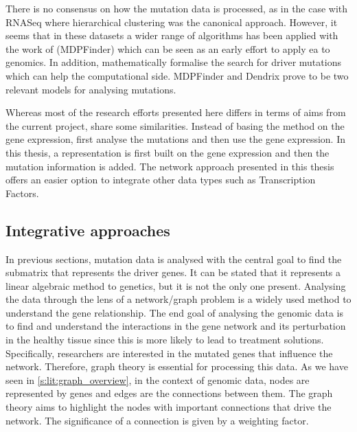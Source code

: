 There is no consensus on how the mutation data is processed, as in the case with RNASeq where hierarchical clustering was the canonical approach. However, it seems that in these datasets a wider range of algorithms has been applied with the work of \citet{Zhao2012-wj} (MDPFinder) which can be seen as an early effort to apply \acrshort{ea} to genomics. In addition, \citet{Vandin2012-cf} mathematically formalise the search for driver mutations which can help the computational side. MDPFinder and Dendrix prove to be two relevant models for analysing mutations. 

Whereas most of the research efforts presented here differs in terms of aims from the current project, \citet{Zhao2012-wj} share some similarities. Instead of basing the method on the gene expression, \citet{Zhao2012-wj} first analyse the mutations and then use the gene expression. In this thesis, a representation is first built on the gene expression and then the mutation information is added. The network approach presented in this thesis offers an easier option to integrate other data types such as Transcription Factors.


\subsection{Integrative approaches} \label{s:lit:multi-view}

\vspace{3mm}
\vspace{3mm}

In previous sections, mutation data is analysed with the central goal to find the submatrix that represents the driver genes. It can be stated that it represents a linear algebraic method to genetics, but it is not the only one present. Analysing the data through the lens of a network/graph problem is a widely used method to understand the gene relationship. The end goal of analysing the genomic data is to find and understand the interactions in the gene network and its perturbation in the healthy tissue since this is more likely to lead to treatment solutions. Specifically, researchers are interested in the mutated genes that influence the network. Therefore, graph theory is essential for processing this data. As we have seen in \cref{s:lit:graph_overview}, in the context of genomic data, nodes are represented by genes and edges are the connections between them. The graph theory aims to highlight the nodes with important connections that drive the network. The significance of a connection is given by a weighting factor.

